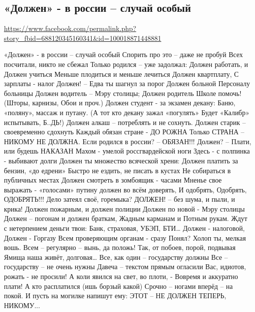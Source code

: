  
 

\subsection{«Должен» - в россии – случай особый}

\url{https://www.facebook.com/permalink.php?story_fbid=688120345160341&id=100018871448881}

«Должен» - в россии – случай особый
Спорить про это – даже не пробуй
Всех посчитали, никто не сбежал
Только родился – уже задолжал:
Должен работать, и Должен учиться
Меньше плодиться и меньше лечиться
Должен квартплату, С зарплаты - налог
Должен! – Едва ты шагнул за порог
Должен больной Персоналу больницы
Должен водитель – Мэру столицы;
Должен родитель Школе помочь!
(Шторы, карнизы, Обои и проч.)
Должен студент - за экзамен декану:
Баню, «поляну», массаж и путану.
(А тот кто декану зажал «погулять»
Будет «Калибр» испытывать, Б..ДЬ!)
Должен алкаш – потреблять и не сохнуть.
Должен старик – своевременно сдохнуть
Каждый обязан стране - ДО РОЖНА
Только СТРАНА – НИКОМУ НЕ ДОЛЖНА.
Если родился в россии? – ОБЯЗАН!!!
Должен? – Плати, или будешь НАКАЗАН
Махом - умелой россгвардейской ноги
Здесь - с полпинка - выбивают долги
Должен ты множество всяческой хрени:
Должен платить за бензин, «до едрени»
Быстро не ездить, не писать в кустах
Не собираться в публичных местах
Должен смотреть в зомбоящик - часами
Мненье свое выражать - «голосами»
путину должен во всём доверять,
И одобрять, Одобрять, ОДОБРЯТЬ!!!
Дело затеял своё, горемыка?
ДОЛЖЕН! – без шума, и пыли, и крика!
Должен пожарным, и должен полиции
Должен по новой - Мэру столицы
Должен – погонам и должен браткам,
Жадным карманам и Потным рукам.
Ждут с нетерпением деньги твои:
Банк, страховая, УБЭП, БТИ…
Должен - налоговой, Должен - Горгазу
Всем проверяющим органам - сразу
Понял? Холоп ты, мелкая вошь.
Всем – регулярно – вынь, да положь!
Так, от побоев, порой, подвывая
Ямища наша живёт, долговая…
Все, как один – государству должны
Все – государству – не очень нужны
Давеча – текстом прямым огласили
Вас, идиотов, рожать - не просили!
А коли явился на свет, во плоти, -
Вовремя и аккуратно плати!
А кто расплатился (ишь борзый какой)
Срочно – ногами вперёд – на покой.
И пусть на могилке напишут ему:
ЭТОТ – НЕ ДОЛЖЕН ТЕПЕРЬ, НИКОМУ...
